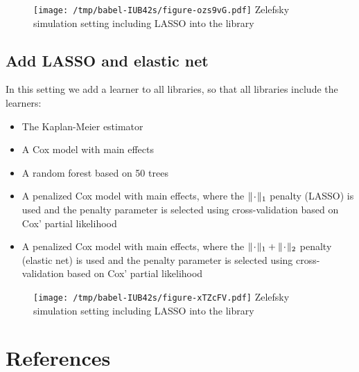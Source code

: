 \documentclass[a4paper,danish]{article}
\begin{document}
\begin{figure}[htbp]
\centering
\texttt{[image: /tmp/babel-IUB42s/figure-ozs9vG.pdf]}
Zelefsky simulation setting including LASSO into the library
\end{figure}

\subsection{Add LASSO and elastic net}
\label{sec:org062c3d9}
In this setting we add a learner to all libraries, so that all libraries include
the learners:

\begin{itemize}
\item The Kaplan-Meier estimator
\item A Cox model with main effects
\item A random forest based on 50 trees
\item A penalized Cox model with main effects, where the \(\|\blank\|_1\) penalty
(LASSO) is used and the penalty parameter is selected using cross-validation
based on Cox' partial likelihood
\item A penalized Cox model with main effects, where the \(\|\blank\|_1 +
  \|\blank\|_2\) penalty (elastic net) is used and the penalty parameter is
selected using cross-validation based on Cox' partial likelihood
\end{itemize}

\begin{figure}[htbp]
\centering
\texttt{[image: /tmp/babel-IUB42s/figure-xTZcFV.pdf]}
Zelefsky simulation setting including LASSO into the library
\end{figure}



\section{References}
\label{sec:org3ba31f0}
\renewcommand{\section}[2]{} 

\end{document}
